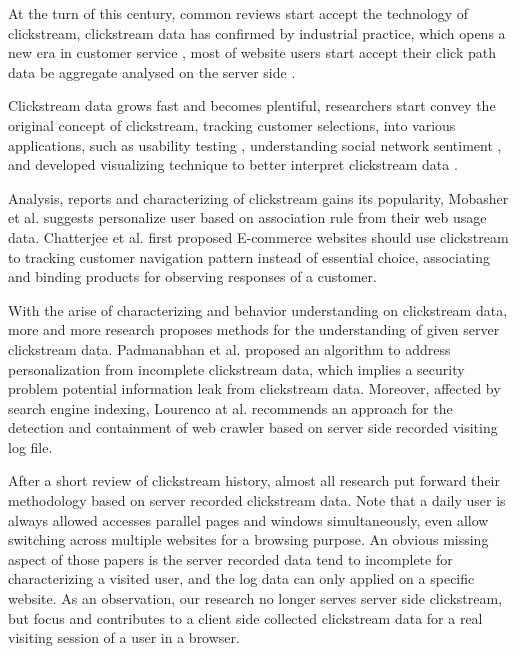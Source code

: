 At the turn of this century, common reviews start accept the technology of clickstream,
clickstream data has confirmed by industrial practice, which opens a new era in 
customer service \cite{walsh2000internet}, most of website users start accept their click path data 
be aggregate analysed on the server side \cite{carr2000hypermediation}.

Clickstream data grows fast and becomes plentiful, researchers start convey the original concept of clickstream,
tracking customer selections, into various applications, such as usability testing \cite{Waterson:2002:LOW:506443.506602},
understanding social network sentiment \cite{Schneider:2009:UOS:1644893.1644899}, and developed visualizing
technique to better interpret clickstream data \cite{Waterson:2002:DTU:1556262.1556276}.

Analysis, reports and characterizing of clickstream gains its popularity, Mobasher et al. \cite{Mobasher:2001:EPB:502932.502935}
suggests personalize user based on association rule from their web usage data. Chatterjee et al. \cite{chatterjee2003modeling} 
first proposed E-commerce websites should use clickstream to tracking customer navigation pattern instead of essential choice, 
associating and binding products for observing responses of a customer.

With the arise of characterizing and behavior understanding on clickstream data, more 
and more research proposes methods for the understanding of given server clickstream data.
Padmanabhan et al. \cite{Padmanabhan:2001:PID:502512.502535}
proposed an algorithm to address personalization from incomplete clickstream data, which implies
a security problem potential information leak from clickstream data. 
Moreover, affected by search engine indexing, Lourenco at al. \cite{Lourenco:2006:CWC:1145581.1145634} recommends an approach for
the detection and containment of web crawler based on server side recorded visiting log file.

After a short review of clickstream history, almost all research put forward their 
methodology based on server recorded clickstream data.
Note that a daily user is always allowed accesses parallel pages and windows simultaneously,
even allow switching across multiple websites for a browsing purpose.
An obvious missing aspect of those papers is the server recorded data tend to incomplete for 
characterizing a visited user, and the log data can only applied on a specific website. 
As an observation, our research no longer serves server side clickstream, 
but focus and contributes to a client side collected clickstream data 
for a real visiting session of a user in a browser.

